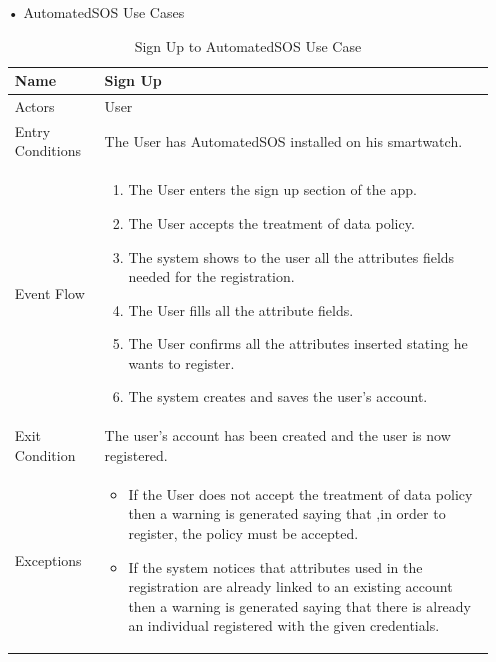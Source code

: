 \begin{enumerate}
\item[•]{\Large AutomatedSOS Use Cases}
\FloatBarrier
\begin{table}[h]
\begin{tabular}{|p{3.4cm}|p{}|}
\hline
Name             & Sign Up \\ \hline
Actors           & User  \\ \hline
Entry Conditions & The User has AutomatedSOS installed on his smartwatch.    \\ \hline
Event Flow       & \begin{enumerate}
            \item The User enters the sign up section of the app.
            \item The User accepts the treatment of data policy.
            \item The system shows to the user all the attributes fields needed for the registration.
            \item The User fills all the attribute fields.
            \item The User confirms all the attributes inserted stating he wants to register.
            \item The system creates and saves the user's account.
        \end{enumerate}\\ \hline
Exit Condition   & The user's account has been created and the user is now registered.\\ \hline
Exceptions       & \begin{itemize}
\item If the User does not accept the treatment of data policy then a warning is generated saying that ,in order to register, the policy must be accepted.
\item If the system notices that attributes used in the registration are already linked to an existing account then a warning is generated saying that there is already an individual registered with the given credentials.
\end{itemize}\\ \hline
\end{tabular}
\caption{Sign Up to AutomatedSOS Use Case}
\end{table}
\FloatBarrier


\end{enumerate}
